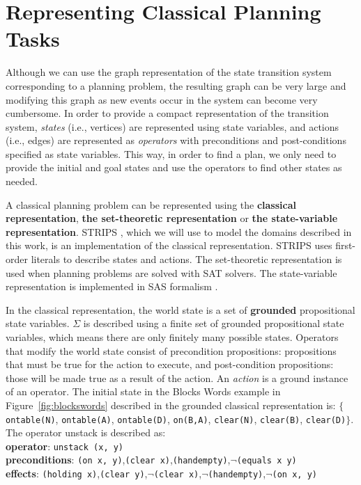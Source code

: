 \section{Representing Classical Planning Tasks}
Although we can use the graph representation of the state transition system corresponding to a planning problem, the resulting graph can be very large and modifying this graph as new events occur in the system can become very cumbersome. In order to provide a compact representation of the transition system, \textit{states} (i.e., vertices) are represented using state variables, and actions (i.e., edges) are represented as \textit{operators} with preconditions and post-conditions specified as state variables. This way, in order to find a plan, we only need to provide the initial and goal states and use the operators to find other states as needed.

A classical planning problem can be represented using the \textbf{classical representation}, \textbf{the set-theoretic representation} or \textbf{the state-variable representation}. STRIPS \cite{fikes1971strips}, which we will use to model the domains described in this work, is an implementation of the classical representation. STRIPS uses first-order literals to describe states and actions. The set-theoretic representation is used when planning problems are solved with SAT solvers. The state-variable representation is implemented in SAS formalism \cite{backstrom91}.

In the classical representation, the world state is a set of \textbf{grounded} propositional state variables. $\Sigma$ is described using a finite set of grounded propositional state variables, which means there are only finitely many possible states. Operators that modify the world state consist of precondition propositions: propositions that must be true for the action to execute, and post-condition propositions: those will be made true as a result of the action. An \textit{action} is a ground instance of an operator. The initial state in the Blocks Words example in Figure~\ref{fig:blockswords} described in the grounded classical representation is: $\lbrace$
\texttt{ontable(N)}, \texttt{ontable(A)}, \texttt{ontable(D)}, \texttt{on(B,A)}, \texttt{clear(N)}, \texttt{clear(B)}, \texttt{clear(D)}$\rbrace$. The operator unstack is described as: \\
\textbf{operator}: \texttt{unstack (x, y)}\\[-0.5em]
\textbf{preconditions}: \texttt{(on x, y)},\texttt{(clear x)},\texttt{(handempty)},$\neg$\texttt{(equals x y)}\\[-0.5em]
\textbf{effects}: \texttt{(holding x)},\texttt{(clear y)},$\neg$\texttt{(clear x)},$\neg$\texttt{(handempty)},$\neg$\texttt{(on x, y)}

